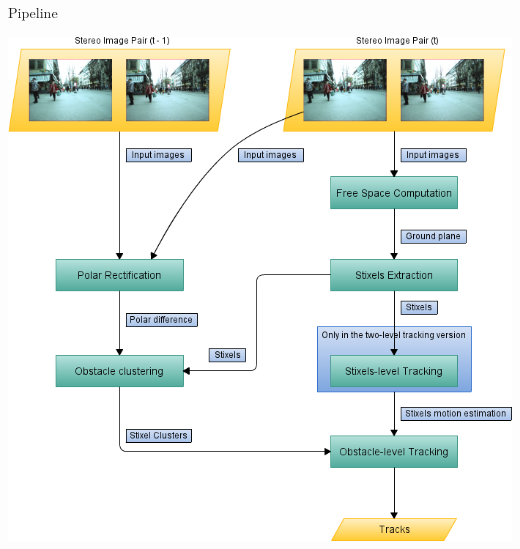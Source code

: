 \begin{frame}{Pipeline}
  \begin{center}
    \includegraphics{pipeline_cp04}
  \end{center}
  
  \note {

  }
\end{frame}


